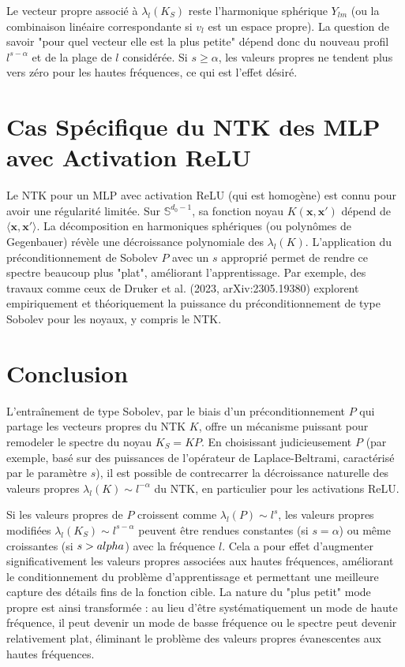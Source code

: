 \documentclass{article}
\newcommand{\x}{\mathbf{x}}
\begin{document}
Le vecteur propre associé à $\lambda_l(K_S)$ reste l'harmonique sphérique $Y_{lm}$ (ou la combinaison linéaire correspondante si $v_l$ est un espace propre). La question de savoir "pour quel vecteur elle est la plus petite" dépend donc du nouveau profil $l^{s-\alpha}$ et de la plage de $l$ considérée. Si $s \ge \alpha$, les valeurs propres ne tendent plus vers zéro pour les hautes fréquences, ce qui est l'effet désiré.

\section{Cas Spécifique du NTK des MLP avec Activation ReLU}
Le NTK pour un MLP avec activation ReLU (qui est homogène) est connu pour avoir une régularité limitée. Sur $\mathbb{S}^{d_0-1}$, sa fonction noyau $K(\x, \x')$ dépend de $\langle \x, \x' \rangle$. La décomposition en harmoniques sphériques (ou polynômes de Gegenbauer) révèle une décroissance polynomiale des $\lambda_l(K)$. L'application du préconditionnement de Sobolev $P$ avec un $s$ approprié permet de rendre ce spectre beaucoup plus "plat", améliorant l'apprentissage. Par exemple, des travaux comme ceux de Druker et al. (2023, arXiv:2305.19380) explorent empiriquement et théoriquement la puissance du préconditionnement de type Sobolev pour les noyaux, y compris le NTK.

\section{Conclusion}
L'entraînement de type Sobolev, par le biais d'un préconditionnement $P$ qui partage les vecteurs propres du NTK $K$, offre un mécanisme puissant pour remodeler le spectre du noyau $K_S = KP$. En choisissant judicieusement $P$ (par exemple, basé sur des puissances de l'opérateur de Laplace-Beltrami, caractérisé par le paramètre $s$), il est possible de contrecarrer la décroissance naturelle des valeurs propres $\lambda_l(K) \sim l^{-\alpha}$ du NTK, en particulier pour les activations ReLU.

Si les valeurs propres de $P$ croissent comme $\lambda_l(P) \sim l^s$, les valeurs propres modifiées $\lambda_l(K_S) \sim l^{s-\alpha}$ peuvent être rendues constantes (si $s=\alpha$) ou même croissantes (si $s>\\alpha$) avec la fréquence $l$. Cela a pour effet d'augmenter significativement les valeurs propres associées aux hautes fréquences, améliorant le conditionnement du problème d'apprentissage et permettant une meilleure capture des détails fins de la fonction cible. La nature du "plus petit" mode propre est ainsi transformée : au lieu d'être systématiquement un mode de haute fréquence, il peut devenir un mode de basse fréquence ou le spectre peut devenir relativement plat, éliminant le problème des valeurs propres évanescentes aux hautes fréquences.
\end{document}
